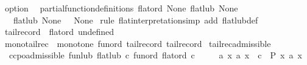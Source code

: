 \begin{isabellebody}
\endisatagproof
{\isafoldproof}%
%
\isadelimproof
\isanewline
%
\endisadelimproof
\isanewline
{}\isamarkupfalse%
\ option{\isacharcolon}{\kern0pt}\isanewline
\ \ partial{\isacharunderscore}{\kern0pt}function{\isacharunderscore}{\kern0pt}definitions\ {\isachardoublequoteopen}flat{\isacharunderscore}{\kern0pt}ord\ None{\isachardoublequoteclose}\ {\isachardoublequoteopen}flat{\isacharunderscore}{\kern0pt}lub\ None{\isachardoublequoteclose}\isanewline
\ \ \ {\isachardoublequoteopen}flat{\isacharunderscore}{\kern0pt}lub\ None\ {\isacharbraceleft}{\kern0pt}{\isacharbraceright}{\kern0pt}\ {\isasymequiv}\ None{\isachardoublequoteclose}\isanewline
%
\isadelimproof
%
\endisadelimproof
%
\isatagproof
{}\isamarkupfalse%
\ {\isacharparenleft}{\kern0pt}rule\ flat{\isacharunderscore}{\kern0pt}interpretation{\isacharparenright}{\kern0pt}{\isacharparenleft}{\kern0pt}simp\ add{\isacharcolon}{\kern0pt}\ flat{\isacharunderscore}{\kern0pt}lub{\isacharunderscore}{\kern0pt}def{\isacharparenright}{\kern0pt}%
\endisatagproof
{\isafoldproof}%
%
\isadelimproof
\isanewline
%
\endisadelimproof
\isanewline
\isanewline
{}\isamarkupfalse%
\ {\isachardoublequoteopen}tailrec{\isacharunderscore}{\kern0pt}ord\ {\isasymequiv}\ flat{\isacharunderscore}{\kern0pt}ord\ undefined{\isachardoublequoteclose}\isanewline
{}\isamarkupfalse%
\ {\isachardoublequoteopen}mono{\isacharunderscore}{\kern0pt}tailrec\ {\isasymequiv}\ monotone\ {\isacharparenleft}{\kern0pt}fun{\isacharunderscore}{\kern0pt}ord\ tailrec{\isacharunderscore}{\kern0pt}ord{\isacharparenright}{\kern0pt}\ tailrec{\isacharunderscore}{\kern0pt}ord{\isachardoublequoteclose}\isanewline
\isanewline
{}\isamarkupfalse%
\ tailrec{\isacharunderscore}{\kern0pt}admissible{\isacharcolon}{\kern0pt}\isanewline
\ \ {\isachardoublequoteopen}ccpo{\isachardot}{\kern0pt}admissible\ {\isacharparenleft}{\kern0pt}fun{\isacharunderscore}{\kern0pt}lub\ {\isacharparenleft}{\kern0pt}flat{\isacharunderscore}{\kern0pt}lub\ c{\isacharparenright}{\kern0pt}{\isacharparenright}{\kern0pt}\ {\isacharparenleft}{\kern0pt}fun{\isacharunderscore}{\kern0pt}ord\ {\isacharparenleft}{\kern0pt}flat{\isacharunderscore}{\kern0pt}ord\ c{\isacharparenright}{\kern0pt}{\isacharparenright}{\kern0pt}\isanewline
\ \ \ \ \ {\isacharparenleft}{\kern0pt}{\isasymlambda}a{\isachardot}{\kern0pt}\ {\isasymforall}x{\isachardot}{\kern0pt}\ a\ x\ {\isasymnoteq}\ c\ {\isasymlongrightarrow}\ P\ x\ {\isacharparenleft}{\kern0pt}a\ x{\isacharparenright}{\kern0pt}{\isacharparenright}{\kern0pt}{\isachardoublequoteclose}\isanewline

\end{isabellebody}
